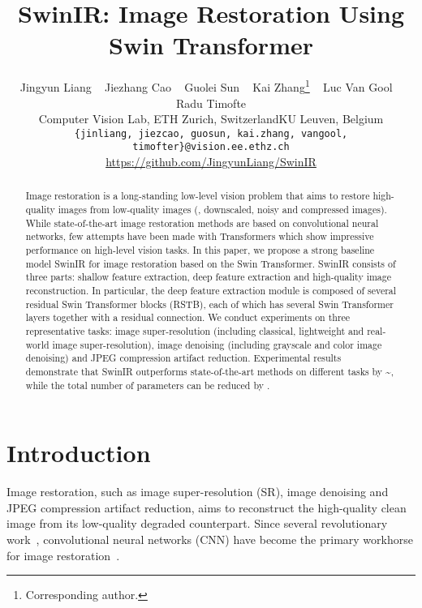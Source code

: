 \documentclass[10pt,twocolumn,letterpaper]{article}
\newlength \g
\begin{document}
\title{SwinIR: Image Restoration Using Swin Transformer}
\author{\hspace{-0.4cm}Jingyun Liang ~ Jiezhang Cao  ~ Guolei Sun ~ Kai Zhang\thanks{Corresponding author.} ~ Luc Van Gool ~ Radu Timofte\\
Computer Vision Lab, ETH Zurich, Switzerland\quad\quad KU Leuven, Belgium\\
{\tt\small \hspace{-0.6cm}\{jinliang, jiezcao, guosun, kai.zhang, vangool, timofter\}@vision.ee.ethz.ch}\\ 
{\tt\small }\url{https://github.com/JingyunLiang/SwinIR}
}

\maketitle


\begin{abstract}
Image restoration is a long-standing low-level vision problem that aims to restore high-quality images from low-quality images (\eg, downscaled, noisy and compressed images). While state-of-the-art image restoration methods are based on convolutional neural networks, few attempts have been made with Transformers which show impressive performance on high-level vision tasks. In this paper, we propose a strong baseline model SwinIR for image restoration based on the Swin Transformer. SwinIR consists of three parts: shallow feature extraction, deep feature extraction and high-quality image reconstruction. In particular, the deep feature extraction module is composed of several residual Swin Transformer blocks (RSTB), each of which has several Swin Transformer layers together with a residual connection. We conduct experiments on three representative tasks: image super-resolution (including classical, lightweight and real-world image super-resolution), image denoising (including grayscale and color image denoising) and JPEG compression artifact reduction. Experimental results demonstrate that SwinIR outperforms state-of-the-art methods on different tasks by \sim, while the total number of parameters can be reduced by .
\end{abstract}


\section{Introduction}
Image restoration, such as image super-resolution (SR), image denoising and JPEG compression artifact reduction, aims to reconstruct the high-quality clean image from its low-quality degraded counterpart. Since several revolutionary work~\cite{dong2014srcnn, kim2016vdsr, zhang2017DnCNN, zhang2017IRCNN}, convolutional neural networks (CNN) have become the primary workhorse for image restoration~\cite{ledig2017srresnet, lim2017edsr, ledig2017srresnet, wang2018esrgan, zhang2018ffdnet, zhang2018rcan, fritsche2019frequency, zhang2018srmd, li2019SRFBN, kai2021bsrgan, zhang2021DPIR}. 
\end{document}
